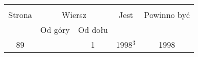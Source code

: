 \documentclass[a4paper,11pt]{article}
\begin{document}
























\vspace{\spaceFive}


\begin{center}

  \begin{tabular}{|c|c|c|c|c|}
    \hline
    & \multicolumn{2}{c|}{} & & \\
    Strona & \multicolumn{2}{c|}{Wiersz} & Jest
                              & Powinno być \\ \cline{2-3}
    & Od góry & Od dołu & & \\
    \hline
    89 & &  1 & 1998$^{ 3 }$ & 1998 \\
    \hline
  \end{tabular}

\end{center}

\vspace{\spaceTwo}














{}






\end{document}
